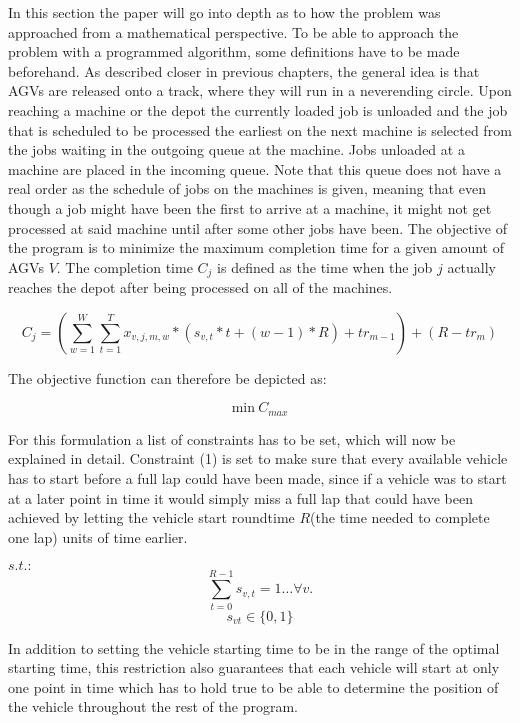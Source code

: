 In this section the paper will go into depth as to how the problem was approached from a mathematical perspective. To be able to approach the problem
with a programmed algorithm, some definitions have to be made beforehand. As described closer in previous chapters, the general idea is that AGVs
are released onto a track, where they will run in a neverending circle. Upon reaching a machine or the depot the currently loaded job is unloaded and
the job that is scheduled to be processed the earliest on the next machine is selected from the jobs waiting in the outgoing queue at the machine.
Jobs unloaded at a machine are placed in the incoming queue. Note that this queue does not have a real order as the schedule of jobs on the machines is
given, meaning that even though a job might have been the first to arrive at a machine, it might not get processed at said machine until after some
other jobs have been. The objective of the program is to minimize the maximum completion time for a given amount of AGVs \(V\). The completion time
\(C_{j}\) is defined as the time when the job \(j\) actually reaches the depot after being processed on all of the machines.

\[
  C_{j} = (\sum_{w=1}^{W}\sum_{t=1}^{T} x_{v,j,m,w} * (s_{v,t} * t + (w-1) * R) + tr_{m-1}) + (R-tr_{m})
\]

The objective function can therefore be depicted as:

\begin{equation}
\mathrm{min}\>C_{max}
\end{equation}

For this formulation a list of constraints has to be set, which will now be explained in detail. Constraint (1) is set to make sure
that every available vehicle has to start before a full lap could have been made, since if a vehicle was to start at a later point in time it would
simply miss a full lap that could have been achieved by letting the vehicle start roundtime \(R\)(the time needed to complete one lap) units of time earlier.

\(s.t.:\)
\begin{equation}
\sum_{t=0}^{R-1}s_{v,t} = 1\ldots \forall v.
\end{equation}
\begin{equation}
s_{v t}\in\{0,1\}
\end{equation}

In addition to setting the vehicle starting time to be in the range of the optimal starting time, this restriction also guarantees that each vehicle
will start at only one point in time which has to hold true to be able to determine the position of the vehicle throughout the rest of the program.

